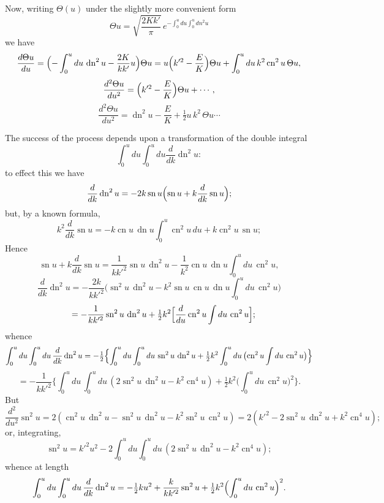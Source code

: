 \documentclass[12pt,a4paper]{article}
\begin{document}
Now, writing $\Theta(u)$ under the slightly more convenient form
\[
\Theta u = \sqrt{\frac{2Kk'}{\pi}}\,e^{-\int_0^u du \int_0^u dn^2 u}
\]
we have
\[
\frac{d\Theta u}{du} = \Bigl(-\int_0^u du\,\operatorname{dn}^2 u - \frac{2K}{k k'}u\Bigr)\Theta u = u\Bigl(k'^2 - \frac{E}{K}\Bigr)\Theta u + \int_0^u du\,k^2\operatorname{cn}^2 u\,\Theta u,
\]
\[
\frac{d^2\Theta u}{du^2} = \Bigl(k'^2 - \frac{E}{K}\Bigr)\Theta u + \cdots,
\]
\[
\frac{d^2\Theta u}{du^2} = \operatorname{dn}^2 u - \frac{E}{K} + \tfrac12 u\,k^2\,\Theta u\cdots
\]

The success of the process depends upon a transformation of the double integral
\[
\int_0^u du \int_0^u du \frac{d}{dk}\operatorname{dn}^2 u:
\]
to effect this we have
\[
\frac{d}{dk}\operatorname{dn}^2 u = -2k\operatorname{sn} u\Bigl(\operatorname{sn} u + k\frac{d}{dk}\operatorname{sn} u\Bigr);
\]
but, by a known formula,
\[
k^2\frac{d}{dk}\operatorname{sn} u = -k\operatorname{cn} u\,\operatorname{dn} u \int_0^u\operatorname{cn}^2 u\,du + k\operatorname{cn}^2 u\,\operatorname{sn} u;
\]
Hence
\[
\operatorname{sn} u + k\frac{d}{dk}\operatorname{sn} u = \frac{1}{k k'^2}\operatorname{sn} u\,\operatorname{dn}^2 u - \frac{1}{k^2}\operatorname{cn} u\,\operatorname{dn} u \int_0^u du\,\operatorname{cn}^2 u,
\]
\[
\frac{d}{dk}\operatorname{dn}^2 u = -\frac{2k}{k k'^2}\bigl(\operatorname{sn}^2 u\,\operatorname{dn}^2 u - k^2\operatorname{sn} u\,\operatorname{cn} u\,\operatorname{dn} u \int_0^u du\,\operatorname{cn}^2 u\bigr)
\]
\[
\quad = -\frac{1}{k k'^2}\operatorname{sn}^2 u\,\operatorname{dn}^2 u + \tfrac12 k^2\Bigl[\frac{d}{du}\operatorname{cn}^2 u\int du\,\operatorname{cn}^2 u\Bigr];
\]
whence
\[
\int_0^u du \int_0^u du\,\frac{d}{dk}\operatorname{dn}^2 u = -\tfrac{1}{2}\Bigl\{\int_0^u du \int_0^u du\,\operatorname{sn}^2 u\,\operatorname{dn}^2 u + \tfrac12 k^2\int_0^u du\,\bigl(\operatorname{cn}^2 u \int du\,\operatorname{cn}^2 u\bigr)\Bigr\}
\]
\[
= -\frac{1}{k k'^2}\bigl\{\int_0^u du\,\int_0^u du\,(2\operatorname{sn}^2 u\,\operatorname{dn}^2 u - k^2\operatorname{cn}^4 u) + \tfrac12 k^2\bigl(\int_0^u du\,\operatorname{cn}^2 u\bigr)^2\bigr\}.
\]
But
\[
\frac{d^2}{du^2}\operatorname{sn}^2 u = 2(\operatorname{cn}^2 u\,\operatorname{dn}^2 u - \operatorname{sn}^2 u\,\operatorname{dn}^2 u - k^2\operatorname{sn}^2 u\,\operatorname{cn}^2 u) = 2(k'^2 - 2\operatorname{sn}^2 u\,\operatorname{dn}^2 u + k^2\operatorname{cn}^4 u);
\]
or, integrating,
\[
\operatorname{sn}^2 u = k'^2 u^2 - 2\int_0^u du \int_0^u du\,(2\operatorname{sn}^2 u\,\operatorname{dn}^2 u - k^2\operatorname{cn}^4 u);
\]
whence at length
\[
\int_0^u du \int_0^u du\,\frac{d}{dk}\operatorname{dn}^2 u = -\tfrac12 k u^2 + \frac{k}{k k'^2}\operatorname{sn}^2 u + \tfrac12 k^2\Bigl(\int_0^u du\,\operatorname{cn}^2 u\Bigr)^2.
\]
\end{document}
